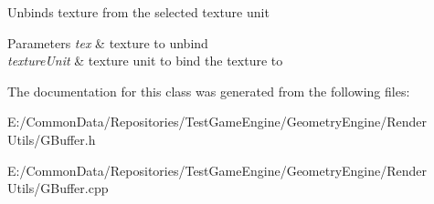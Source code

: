 Unbinds texture from the selected texture unit 
\begin{DoxyParams}{Parameters}
{\em tex} & texture to unbind \\
\hline
{\em texture\+Unit} & texture unit to bind the texture to \\
\hline
\end{DoxyParams}


The documentation for this class was generated from the following files\+:\begin{DoxyCompactItemize}
\item 
E\+:/\+Common\+Data/\+Repositories/\+Test\+Game\+Engine/\+Geometry\+Engine/\+Render Utils/G\+Buffer.\+h\item 
E\+:/\+Common\+Data/\+Repositories/\+Test\+Game\+Engine/\+Geometry\+Engine/\+Render Utils/G\+Buffer.\+cpp\end{DoxyCompactItemize}
